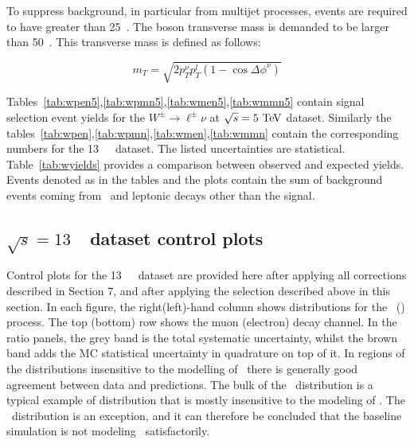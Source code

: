 To suppress background, in particular from multijet processes,
events are required to have \MET{} greater than 25~\GeV{}.
The \Wboson{} boson transverse mass \mt{} is demanded to be larger than 50~\GeV.
This transverse mass is defined as follows:

\begin{equation}\label{eq:mt}
{m}_{T} = \sqrt{2 {p}_{T}^{\nu}p_{T} ^{l} (1-\cos\Delta\phi^{\nu})}
\end{equation}

Tables~\ref{tab:wpen5},\ref{tab:wpmn5},\ref{tab:wmen5},\ref{tab:wmmn5} contain signal selection event yields for the $W^{\pm} \rightarrow \ell^{\pm}\nu$  at $\sqrt{s} = 5~\text{Te\kern -0.1em V}$ \lowmu dataset. Similarly the tables~\ref{tab:wpen},\ref{tab:wpmn},\ref{tab:wmen},\ref{tab:wmmn} contain the corresponding numbers for the 13~\TeV\ \lowmu\ dataset. The listed uncertainties are statistical. Table~\ref{tab:wyields} provides a comparison between observed and expected yields.
Events denoted as \Wln{} in the tables and the plots contain the sum of background events coming from \Wtaunu\ and \Wboson{} leptonic decays other than the signal.






\subsection{$\sqrt{s} = 13$~\TeV\ dataset control plots}
\label{subsec:controlplots13}
Control plots for the 13~\TeV\ \lowmu\ dataset are provided here after applying all corrections described in Section 7, and after applying the selection described above in this section. In each figure, the right(left)-hand column shows distributions for the \Wplus\ (\Wminus) process. The top (bottom) row shows the muon (electron) decay channel. In the ratio panels, the grey band is the total systematic uncertainty, whilst the brown band adds the MC statistical uncertainty in quadrature on top of it. In regions of the distributions insensitive to the modelling of \ptw\ there is generally good agreement between data and predictions. The bulk of the \mt\ distribution is a typical example of distribution that is mostly insensitive to the modeling of \ptw. The \ut\ distribution is an exception, and it can therefore be concluded that the baseline simulation is not modeling \ptw\ satisfactorily.
\newpage


